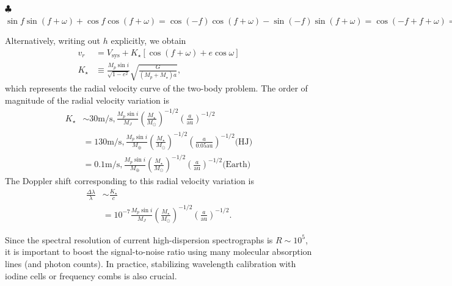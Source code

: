 \begin{itembox}{$\clubsuit$}
\footnotesize
\color{gray}
$\sin{f} \sin{(f+\omega)} + \cos{f} \cos{(f+\omega)} = \cos{(-f)} \cos{(f+\omega)} - \sin{(-f)} \sin{(f+\omega)} = \cos{(-f + f + \omega)} = \cos{\omega}$
\end{itembox}

Alternatively, writing out $h$ explicitly, we obtain
\begin{align}
\label{eq:vrsatarefinal}
v_r &= V_\mathrm{sys} + K_\star \left[ \cos{(f+\omega)} + e \cos{\omega} \right] \\
\label{eq:vrKrv}
K_\star &\equiv \frac{M_p \sin{i}}{\sqrt{1 - e^2}} \sqrt{\frac{G}{(M_p + M_\star) a}} ,
\end{align}
which represents the radial velocity curve of the two-body problem. The order of magnitude of the radial velocity variation is
\begin{align}
K_\star &\sim 30 \mathrm{m/s} , \frac{M_p \sin{i}}{M_J}\left(\frac{M_\star}{M_\odot} \right)^{-1/2} \left(\frac{a}{\mathrm{au}} \right)^{-1/2} \\
&= 130 \mathrm{m/s} , \frac{M_p \sin{i}}{M_\oplus}\left(\frac{M_\star}{M_\odot} \right)^{-1/2} \left(\frac{a}{0.05 \mathrm{au}} \right)^{-1/2} \mbox{(HJ)} \nonumber \\
&= 0.1 \mathrm{m/s} , \frac{M_p \sin{i}}{M_\oplus}\left(\frac{M_\star}{M_\odot} \right)^{-1/2} \left(\frac{a}{\mathrm{au}} \right)^{-1/2} \mbox{(Earth)} \nonumber
\end{align}
The Doppler shift corresponding to this radial velocity variation is
\begin{align}
\frac{\Delta \lambda}{\lambda} &\sim \frac{K_\star}{c} \nonumber \\
& = 10^{-7} \frac{M_p \sin{i}}{M_J} \left(\frac{M_\star}{M_\odot} \right)^{-1/2} \left(\frac{a}{\mathrm{au}} \right)^{-1/2} .
\end{align}

Since the spectral resolution of current high-dispersion spectrographs is $R \sim 10^5$, it is important to boost the signal-to-noise ratio using many molecular absorption lines (and photon counts). In practice, stabilizing wavelength calibration with iodine cells or frequency combs is also crucial.

